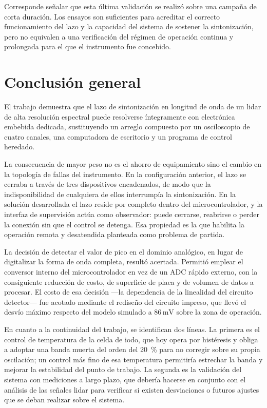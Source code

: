 Corresponde señalar que esta última validación se realizó sobre una campaña de corta
duración. Los ensayos son suficientes para acreditar el correcto funcionamiento del
lazo y la capacidad del sistema de sostener la sintonización, pero no equivalen a una
verificación del régimen de operación continua y prolongada para el que el
instrumento fue concebido.

\section*{Conclusión general}

El trabajo demuestra que el lazo de sintonización en longitud de onda de un lidar de
alta resolución espectral puede resolverse íntegramente con electrónica embebida
dedicada, sustituyendo un arreglo compuesto por un osciloscopio de cuatro canales,
una computadora de escritorio y un programa de control heredado.

La consecuencia de mayor peso no es el ahorro de equipamiento sino el cambio en la
topología de fallas del instrumento. En la configuración anterior, el lazo se cerraba
a través de tres dispositivos encadenados, de modo que la indisponibilidad de
cualquiera de ellos interrumpía la sintonización. En la solución desarrollada el lazo
reside por completo dentro del microcontrolador, y la interfaz de supervisión actúa
como observador: puede cerrarse, reabrirse o perder la conexión sin que el control se
detenga. Esa propiedad es la que habilita la operación remota y desatendida planteada
como problema de partida.

La decisión de detectar el valor de pico en el dominio analógico, en lugar de
digitalizar la forma de onda completa, resultó acertada. Permitió emplear el
conversor interno del microcontrolador en vez de un ADC rápido externo, con la
consiguiente reducción de costo, de superficie de placa y de volumen de datos a
procesar. El costo de esa decisión ---la dependencia de la linealidad del circuito
detector--- fue acotado mediante el rediseño del circuito impreso, que llevó el
desvío máximo respecto del modelo simulado a $86\,\text{mV}$ sobre la zona de
operación.

En cuanto a la continuidad del trabajo, se identifican dos líneas. La primera es el
control de temperatura de la celda de iodo, que hoy opera por histéresis y obliga a
adoptar una banda muerta del orden del 20~\% para no corregir sobre su propia
oscilación; un control más fino de esa temperatura permitiría estrechar la banda y
mejorar la estabilidad del punto de trabajo. La segunda es la validación del sistema con mediciones a largo plazo, que debería hacerse en conjunto con el análisis de las señales lidar para verificar si existen desviaciones o futuros ajustes que se deban realizar sobre el sistema.

